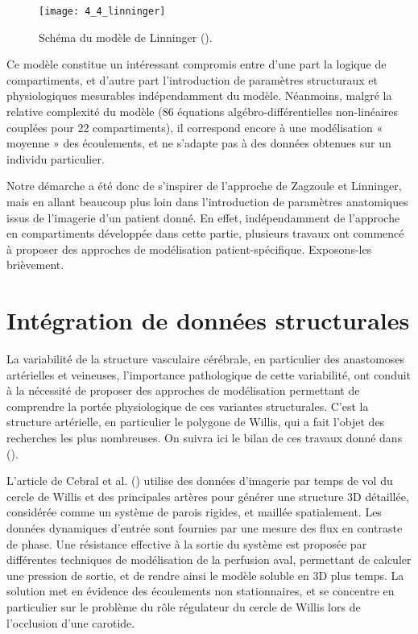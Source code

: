 \begin{figure}[!t]
\centering
\texttt{[image: 4\_4\_linninger]}
\caption{Schéma du modèle de Linninger (\cite{Linninger2009}).}
\label{fig:4_4_linninger}	
\end{figure}
Ce modèle constitue un intéressant compromis entre d'une part la logique de compartiments,
et d'autre part l'introduction de paramètres structuraux et physiologiques mesurables
indépendamment du modèle. Néanmoins, malgré la relative complexité du modèle (86 équations
algébro-différentielles non-linéaires couplées pour 22 compartiments), il correspond encore à une
modélisation « moyenne » des écoulements, et ne s'adapte pas à des données obtenues sur un
individu particulier.

Notre démarche a été donc de s'inspirer de l'approche de Zagzoule et Linninger, mais en allant
beaucoup plus loin dans l'introduction de paramètres anatomiques issus de l'imagerie d'un patient
donné. En effet, indépendamment de l'approche en compartiments développée dans cette partie,
plusieurs travaux ont commencé à proposer des approches de modélisation patient-spécifique.
Exposons-les brièvement.
\section{Intégration de données structurales}
La variabilité de la structure vasculaire cérébrale, en particulier des anastomoses artérielles et
veineuses, l'importance pathologique de cette variabilité, ont conduit à la nécessité de proposer des
approches de modélisation permettant de comprendre la portée physiologique de ces variantes
structurales. C'est la structure artérielle, en particulier le polygone de Willis, qui a fait l'objet des
recherches les plus nombreuses. On suivra ici le bilan de ces travaux donné dans (\cite{David2008}).

L'article de Cebral et al. (\cite{Cebral2003}) utilise des données d'imagerie par temps de vol du cercle de Willis
et des principales artères pour générer une structure 3D détaillée, considérée comme un système de
parois rigides, et maillée spatialement. Les données dynamiques d'entrée sont fournies par une
mesure des flux en contraste de phase. Une résistance effective à la sortie du système est proposée
par différentes techniques de modélisation de la perfusion aval, permettant de calculer une pression
de sortie, et de rendre ainsi le modèle soluble en 3D plus temps. La solution met en évidence des
écoulements non stationnaires, et se concentre en particulier sur le problème du rôle régulateur du
cercle de Willis lors de l'occlusion d'une carotide.

